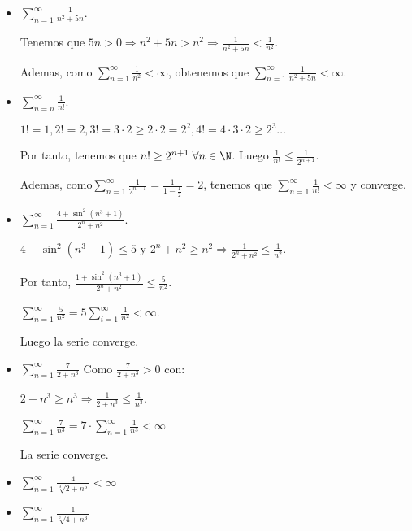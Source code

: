 \vspace{0.7cm}
\begin{example}
	\begin{itemize}
		\item \(\sum_{n =1}^{\infty} \frac{1}{n^{2} + 5n }\).

		      Tenemos que \(5n > 0 \Rightarrow n^{2} + 5n > n^{2} \Rightarrow \frac{1}{n^{2} + 5n } < \frac{1}{n^{2} }  \).

		      Ademas, como \(\sum_{n =1}^{\infty} \frac{1}{n^{2} } < \infty\), obtenemos que \(\sum_{n =1}^{\infty} \frac{1}{n^{2} + 5n } < \infty \).
		\item \(\sum_{n  =n }^{\infty} \frac{1}{n! }\).

		      \(1! = 1, 2! = 2, 3! = 3 \cdot 2 \geq 2 \cdot 2 = 2^{2}, 4! = 4 \cdot 3 \cdot 2 \geq 2^{3} \ldots\)

		      Por tanto, tenemos que \(n! \geq 2^{n+1} \; \forall n \in \N\). Luego \(\frac{1}{n!} \leq \frac{1}{2^{n+1} }\).

		      Ademas, como\(\sum_{n =1}^{\infty} \frac{1}{2^{n-1} } = \frac{1}{1 - \frac{1}{2}} = 2\), tenemos que \(\sum_{n =1}^{\infty} \frac{1}{n!} < \infty \) y converge.

		\item \(\sum_{n =1}^{\infty} \frac{4 + \sin^{2}  (n^{3} +1 )}{2^{n} + n^{2}  }\).

		      \( 4 + \sin^{2}(n^{3} + 1 ) \leq 5  \) y \(2^{n} + n^{2} \geq n^{2} \Rightarrow \frac{1}{2^{n} + n^{2}  } \leq \frac{1}{n^{2} }   \).

		      Por tanto, \(\frac{1 + \sin^{2}(n^{3} +1 )}{2^{n} + n^{2}  } \leq \frac{5}{n^{2} }\).

		      \(\sum_{n =1}^{\infty} \frac{5}{n^{2} } = 5 \sum_{i=1}^{\infty} \frac{1}{n^{2} } < \infty\).

		      Luego la serie converge.

		\item \(\sum_{n =1}^{\infty} \frac{7 }{2 + n^{3 } }\)
		      Como \(\frac{7}{2 + n^{3} } > 0 \) con:

		      \(2 + n^{3} \geq n^{3} \Rightarrow \frac{1}{2 + n^{3} } \leq \frac{1}{n^{3} }\).

		      \(\sum_{n =1}^{\infty} \frac{7}{n^{3} } = 7 \cdot \sum_{n =1}^{\infty} \frac{1}{n^{3} } < \infty\)

		      La serie converge.

		\item \(\sum_{n =1}^{\infty} \frac{4}{\sqrt[3]{2 + n^{5} } } < \infty\)
		\item \(\sum_{n =1}^{\infty} \frac{1}{\sqrt[7]{4 + n^{3} } }\)


\end{itemize}
\end{example}
